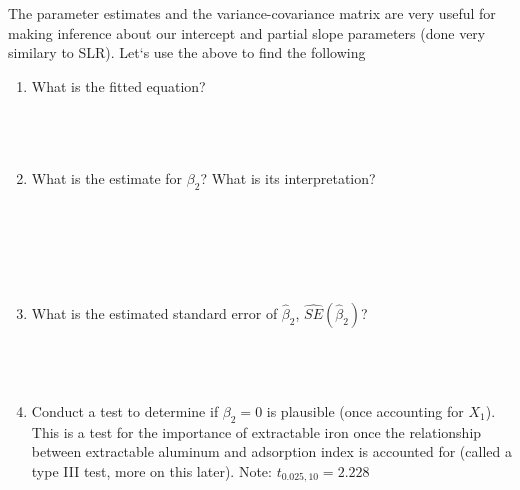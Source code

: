 The parameter estimates and the variance-covariance matrix are very useful for making inference about our intercept and partial slope parameters (done very similary to SLR).  Let`s use the above to find the following
\begin{enumerate}
\item What is the fitted equation?\\~\\~\\~\\
\item What is the estimate for $\beta_2$?  What is its interpretation?\\~\\~\\~\\~\\~\\
\item What is the estimated standard error of $\hat\beta_2$, $\hat{SE}(\hat\beta_2)$?  \\~\\~\\~\\
\item Conduct a test to determine if $\beta_2=0$ is plausible (once accounting for $X_1$).  This is a test for the importance of extractable iron once the relationship between extractable aluminum and adsorption index is accounted for (called a type III test, more on this later).  Note: $t_{0.025, 10}=2.228$\\
\end{enumerate}


